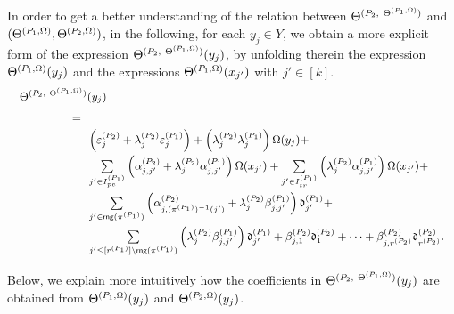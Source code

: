In order to get a better understanding of the relation between $\Theta^{(P_2,\ \Theta^{(P_1,\Omega)})}$ and $(\Theta^{(P_1, \Omega)},\Theta^{(P_2, \Omega)})$, in the following, for each $y_j \in Y$, we obtain a more explicit form of the expression $\Theta^{(P_2,\ \Theta^{(P_1,\Omega)})}(y_j)$, by unfolding therein the expression $\Theta^{(P_1,\Omega)}(y_{j})$ and the expressions $\Theta^{(P_1,\Omega)}(x_{j'})$ with $j' \in [k]$.
\[
\small
\begin{array}{l c l}
\medskip
\sumf^{(P_2,\ \sumf^{(P_1,\initval)})}(y_j) &  & \\
\smallskip
& \hspace{-24mm}  =  &  \\
\smallskip
& & \hspace{-12mm} \left(\cste^{(P_2)}_{j}+\cstl^{(P_2)}_{j} \cste^{(P_1)}_{j}\right)+ \left(\cstl^{(P_2)}_{j} \cstl^{(P_1)}_{j} \right) \initval(y_j)+\\
\smallskip
& &  \hspace{-12mm} \sum \limits_{j' \in I^{(P_1)}_{pe}} \left(\csta^{(P_2)}_{j,j'}+\cstl^{(P_2)}_{j} \csta^{(P_1)}_{j,j'} \right) \initval(x_{j'}) + \sum \limits_{j' \in I^{(P_1)}_{tr}} \left(\cstl^{(P_2)}_{j} \csta^{(P_1)}_{j,j'} \right) \initval(x_{j'}) + \\
%
\smallskip
& & \hspace{-12mm} \sum \limits_{j' \in \rng(\pi^{(P_1)})} \left( \csta^{(P_2)}_{j,(\pi^{(P_1)})^{-1}(j')}+\cstl^{(P_2)}_{j} \cstb^{(P_1)}_{j,j'} \right) \vard^{(P_1)}_{j'} + \\
\medskip
& & \hspace{-12mm}  \sum \limits_{j' \le [r^{(P_1)}] \setminus \rng(\pi^{(P_1)})} \left( \cstl^{(P_2)}_{j} \cstb^{(P_1)}_{j,j'} \right) \vard^{(P_1)}_{j'} + \cstb^{(P_2)}_{j,1} \vard^{(P_2)}_1 +\dots + \cstb^{(P_2)}_{j, r^{(P_2)} } \vard^{(P_2)}_{r^{(P_2)} }.
\end{array}
\] 
Below, we explain more intuitively how the coefficients in $\Theta^{(P_2,\ \Theta^{(P_1,\Omega)})}(y_j)$ are obtained from $\Theta^{(P_1, \Omega)}(y_j)$ and $\Theta^{(P_2, \Omega)}(y_j)$.
